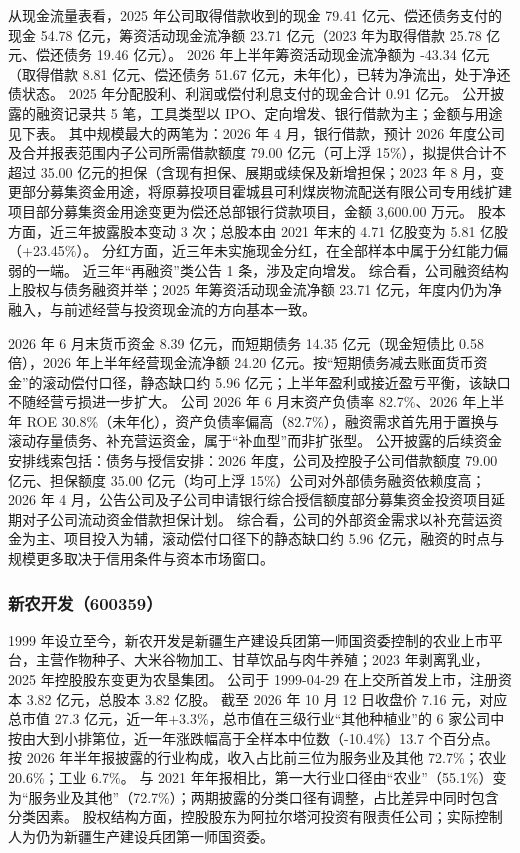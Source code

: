  从现金流量表看，2025 年公司取得借款收到的现金 79.41 亿元、偿还债务支付的现金 54.78 亿元，筹资活动现金流净额 23.71 亿元（2023 年为取得借款 25.78 亿元、偿还债务 19.46 亿元）。 2026 年上半年筹资活动现金流净额为 -43.34 亿元（取得借款 8.81 亿元、偿还债务 51.67 亿元，未年化），已转为净流出，处于净还债状态。 2025 年分配股利、利润或偿付利息支付的现金合计 0.91 亿元。 公开披露的融资记录共 5 笔，工具类型以 IPO、定向增发、银行借款为主；金额与用途见下表。 其中规模最大的两笔为：2026 年 4 月，银行借款，预计 2026 年度公司及合并报表范围内子公司所需借款额度 79.00 亿元（可上浮 15\%），拟提供合计不超过 35.00 亿元的担保（含现有担保、展期或续保及新增担保；2023 年 8 月，变更部分募集资金用途，将原募投项目霍城县可利煤炭物流配送有限公司专用线扩建项目部分募集资金用途变更为偿还总部银行贷款项目，金额 3,600.00 万元。 股本方面，近三年披露股本变动 3 次；总股本由 2021 年末的 4.71 亿股变为 5.81 亿股（+23.45\%）。 分红方面，近三年未实施现金分红，在全部样本中属于分红能力偏弱的一端。 近三年“再融资”类公告 1 条，涉及定向增发。 综合看，公司融资结构上股权与债务融资并举；2025 年筹资活动现金流净额 23.71 亿元，年度内仍为净融入，与前述经营与投资现金流的方向基本一致。

 2026 年 6 月末货币资金 8.39 亿元，而短期债务 14.35 亿元（现金短债比 0.58 倍），2026 年上半年经营现金流净额 24.20 亿元。按“短期债务减去账面货币资金”的滚动偿付口径，静态缺口约 5.96 亿元；上半年盈利或接近盈亏平衡，该缺口不随经营亏损进一步扩大。 公司 2026 年 6 月末资产负债率 82.7\%、2026 年上半年 ROE 30.8\%（未年化），资产负债率偏高（82.7\%），融资需求首先用于置换与滚动存量债务、补充营运资金，属于“补血型”而非扩张型。 公开披露的后续资金安排线索包括：债务与授信安排：2026 年度，公司及控股子公司借款额度 79.00 亿元、担保额度 35.00 亿元（均可上浮 15\%）公司对外部债务融资依赖度高；2026 年 4 月，公告公司及子公司申请银行综合授信额度部分募集资金投资项目延期对子公司流动资金借款担保计划。 综合看，公司的外部资金需求以补充营运资金为主、项目投入为辅，滚动偿付口径下的静态缺口约 5.96 亿元，融资的时点与规模更多取决于信用条件与资本市场窗口。




\subsubsection{新农开发（600359）}
\label{co:600359}

 1999 年设立至今，新农开发是新疆生产建设兵团第一师国资委控制的农业上市平台，主营作物种子、大米谷物加工、甘草饮品与肉牛养殖；2023 年剥离乳业，2025 年控股股东变更为农垦集团。 公司于 1999-04-29 在上交所首发上市，注册资本 3.82 亿元，总股本 3.82 亿股。 截至 2026 年 10 月 12 日收盘价 7.16 元，对应总市值 27.3 亿元，近一年+3.3\%，总市值在三级行业“其他种植业”的 6 家公司中按由大到小排第位，近一年涨跌幅高于全样本中位数（-10.4\%）13.7 个百分点。 按 2026 年半年报披露的行业构成，收入占比前三位为服务业及其他 72.7\%；农业 20.6\%；工业 6.7\%。 与 2021 年年报相比，第一大行业口径由“农业”（55.1\%）变为“服务业及其他”（72.7\%）；两期披露的分类口径有调整，占比差异中同时包含分类因素。 股权结构方面，控股股东为阿拉尔塔河投资有限责任公司；实际控制人为仍为新疆生产建设兵团第一师国资委。

